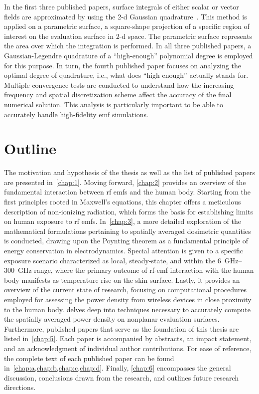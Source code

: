 In the first three published papers, surface integrals of either scalar or vector fields are approximated by using the \gls{2-d} Gaussian quadrature~\cite{Abramowitz1972Handbook}.
This method is applied on a parametric surface, a square-shape projection of a specific region of interest on the evaluation surface in \gls{2-d} space.
The parametric surface represents the area over which the integration is performed.
In all three published papers, a Gaussian-Legendre quadrature of a ``high-enough'' polynomial degree is employed for this purpose.
In turn, the fourth published paper focuses on analyzing the optimal degree of quadrature, i.e., what does ``high enough'' actually stands for.
Multiple convergence tests are conducted to understand how the increasing frequency and spatial discretization scheme affect the accuracy of the final numerical solution.
This analysis is particularly important to be able to accurately handle high-fidelity \gls{emf} simulations.

\section{Outline}
\label{sec:outline}
The motivation and hypothesis of the thesis as well as the list of published papers are presented in~\cref{chap:1}.
Moving forward, \cref{chap:2} provides an overview of the fundamental interaction between \gls{rf} \gls{emf}s and the human body.
Starting from the first principles rooted in Maxwell's equations, this chapter offers a meticulous description of non-ionizing radiation, which forms the basis for establishing limits on human exposure to \gls{rf} \gls{emf}s.
In~\cref{chap:3}, a more detailed exploration of the mathematical formulations pertaining to spatially averaged dosimetric quantities is conducted, drawing upon the Poynting theorem as a fundamental principle of energy conservation in electrodynamics. 
Special attention is given to a specific exposure scenario characterized as local, steady-state, and within the \SIrange{6}{300}{\GHz} range, where the primary outcome of \gls{rf}-\gls{emf} interaction with the human body manifests as temperature rise on the skin surface.
Lastly, it provides an overview of the current state of research, focusing on computational procedures employed for assessing the power density from wireless devices in close proximity to the human body.
 delves deep into techniques necessary to accurately compute the spatially averaged power density on nonplanar evaluation surfaces.
Furthermore, published papers that serve as the foundation of this thesis are listed in~\cref{chap:5}. 
Each paper is accompanied by abstracts, an impact statement, and an acknowledgment of individual author contributions.
For ease of reference, the complete text of each published paper can be found in~\cref{chap:a,chap:b,chap:c,chap:d}.
Finally, \cref{chap:6} encompasses the general discussion, conclusions drawn from the research, and outlines future research directions.

